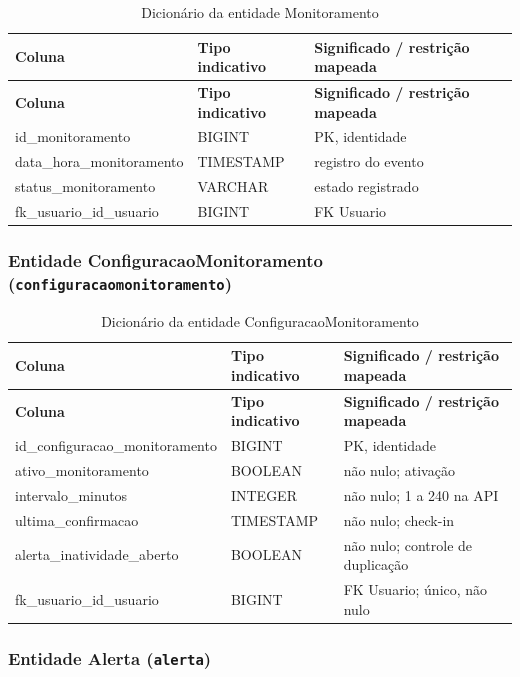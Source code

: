 \begin{longtable}{p{4.8cm}p{3.05cm}p{5.05cm}}
\caption{Dicionário da entidade Monitoramento}\label{quad_monitoramento}\\
\hline
\textbf{Coluna} & \textbf{Tipo indicativo} & \textbf{Significado / restrição mapeada} \\
\hline
\endfirsthead
\hline\textbf{Coluna} & \textbf{Tipo indicativo} & \textbf{Significado / restrição mapeada} \\
\hline
\endhead
id\_monitoramento & BIGINT & PK, identidade \\
\hline
data\_hora\_monitoramento & TIMESTAMP & registro do evento \\
\hline
status\_monitoramento & VARCHAR & estado registrado \\
\hline
fk\_usuario\_id\_usuario & BIGINT & FK Usuario \\
\hline
\end{longtable}

\subsubsection{Entidade ConfiguracaoMonitoramento (\texttt{configuracaomonitoramento})}

\begin{longtable}{p{4.8cm}p{3.05cm}p{5.05cm}}
\caption{Dicionário da entidade ConfiguracaoMonitoramento}\label{quad_configuracaomonitoramento}\\
\hline
\textbf{Coluna} & \textbf{Tipo indicativo} & \textbf{Significado / restrição mapeada} \\
\hline
\endfirsthead
\hline\textbf{Coluna} & \textbf{Tipo indicativo} & \textbf{Significado / restrição mapeada} \\
\hline
\endhead
id\_configuracao\_monitoramento & BIGINT & PK, identidade \\
\hline
ativo\_monitoramento & BOOLEAN & não nulo; ativação \\
\hline
intervalo\_minutos & INTEGER & não nulo; 1 a 240 na API \\
\hline
ultima\_confirmacao & TIMESTAMP & não nulo; check-in \\
\hline
alerta\_inatividade\_aberto & BOOLEAN & não nulo; controle de duplicação \\
\hline
fk\_usuario\_id\_usuario & BIGINT & FK Usuario; único, não nulo \\
\hline
\end{longtable}

\subsubsection{Entidade Alerta (\texttt{alerta})}

